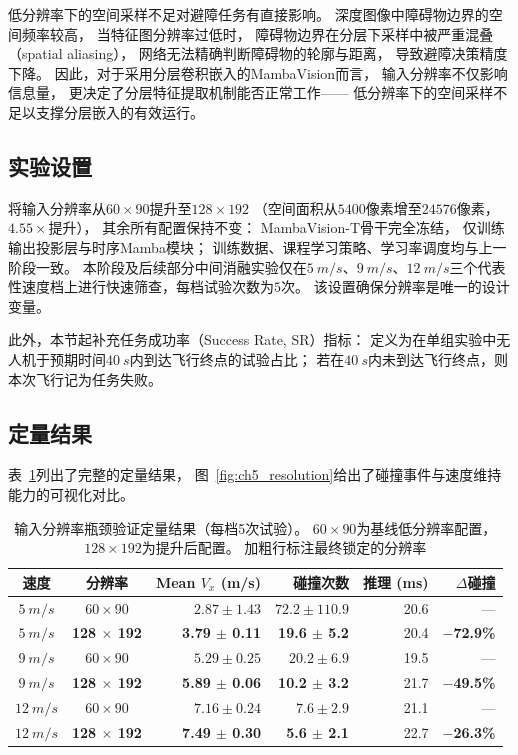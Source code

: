 低分辨率下的空间采样不足对避障任务有直接影响。
深度图像中障碍物边界的空间频率较高，
当特征图分辨率过低时，
障碍物边界在分层下采样中被严重混叠（spatial aliasing），
网络无法精确判断障碍物的轮廓与距离，
导致避障决策精度下降。
因此，对于采用分层卷积嵌入的MambaVision而言，
输入分辨率不仅影响信息量，
更决定了分层特征提取机制能否正常工作——
低分辨率下的空间采样不足以支撑分层嵌入的有效运行。

\subsection{实验设置}

将输入分辨率从$60\times90$提升至$128\times192$
（空间面积从$5400$像素增至$24576$像素，$4.55\times$提升），
其余所有配置保持不变：
MambaVision-T骨干完全冻结，
仅训练输出投影层与时序Mamba模块；
训练数据、课程学习策略、学习率调度均与上一阶段一致。
本阶段及后续部分中间消融实验仅在$\SI{5}{m/s}$、$\SI{9}{m/s}$、$\SI{12}{m/s}$三个代表性速度档上进行快速筛查，每档试验次数为$5$次。
该设置确保分辨率是唯一的设计变量。

此外，本节起补充任务成功率（Success Rate, SR）指标：
定义为在单组实验中无人机于预期时间$\SI{40}{s}$内到达飞行终点的试验占比；
若在$\SI{40}{s}$内未到达飞行终点，则本次飞行记为任务失败。

\subsection{定量结果}

表~\ref{tab:ch5_resolution}列出了完整的定量结果，
图~\ref{fig:ch5_resolution}给出了碰撞事件与速度维持能力的可视化对比。

\begin{table}[htbp]
\centering
\caption{输入分辨率瓶颈验证定量结果（每档5次试验）。
$60\times90$为基线低分辨率配置，$128\times192$为提升后配置。
加粗行标注最终锁定的分辨率}
\label{tab:ch5_resolution}
\begin{tabular}{ccrrrr}
\toprule
\textbf{速度} & \textbf{分辨率} & \textbf{Mean $V_x$ (m/s)} & \textbf{碰撞次数} & \textbf{推理 (ms)} & \textbf{$\Delta$碰撞} \\
\midrule
$\SI{5}{m/s}$  & $60\times90$          & $2.87 \pm 1.43$ & $72.2 \pm 110.9$ & 20.6 & ---  \\
$\SI{5}{m/s}$  & \textbf{128 $\times$ 192} & \textbf{3.79 $\pm$ 0.11} & \textbf{19.6 $\pm$ 5.2} & 20.4 & \textbf{$-$72.9\%} \\
\midrule
$\SI{9}{m/s}$  & $60\times90$          & $5.29 \pm 0.25$ & $20.2 \pm 6.9$ & 19.5 & ---  \\
$\SI{9}{m/s}$  & \textbf{128 $\times$ 192} & \textbf{5.89 $\pm$ 0.06} & \textbf{10.2 $\pm$ 3.2} & 21.7 & \textbf{$-$49.5\%} \\
\midrule
$\SI{12}{m/s}$ & $60\times90$          & $7.16 \pm 0.24$ & $7.6 \pm 2.9$  & 21.1 & ---  \\
$\SI{12}{m/s}$ & \textbf{128 $\times$ 192} & \textbf{7.49 $\pm$ 0.30} & \textbf{5.6 $\pm$ 2.1}  & 22.7 & \textbf{$-$26.3\%} \\
\bottomrule
\end{tabular}
\end{table}

